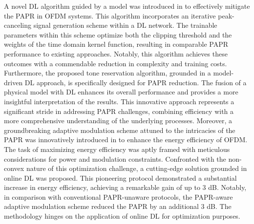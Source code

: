 \documentclass[conference]{IEEEtran}
\begin{document}
A novel DL algorithm guided by a model was introduced in \cite{b149} to effectively mitigate the PAPR in OFDM systems. This algorithm incorporates an iterative peak-canceling signal generation scheme within a DL network. The trainable parameters within this scheme optimize both the clipping threshold and the weights of the time domain kernel function, resulting in comparable PAPR performance to existing approaches. Notably, this algorithm achieves these outcomes with a commendable reduction in complexity and training costs. Furthermore, the proposed tone reservation algorithm, grounded in a model-driven DL approach, is specifically designed for PAPR reduction. The fusion of a physical model with DL enhances its overall performance and provides a more insightful interpretation of the results. This innovative approach represents a significant stride in addressing PAPR challenges, combining efficiency with a more comprehensive understanding of the underlying processes. Moreover, a groundbreaking adaptive modulation scheme attuned to the intricacies of the PAPR was innovatively introduced in \cite{b150} to enhance the energy efficiency of OFDM. The task of maximizing energy efficiency was aptly framed with meticulous considerations for power and modulation constraints. Confronted with the non-convex nature of this optimization challenge, a cutting-edge solution grounded in online DL was proposed. This pioneering protocol demonstrated a substantial increase in energy efficiency, achieving a remarkable gain of up to 3 dB. Notably, in comparison with conventional PAPR-unaware protocols, the PAPR-aware adaptive modulation scheme reduced the PAPR by an additional 3 dB. The methodology hinges on the application of online DL for optimization purposes.
\end{document}
